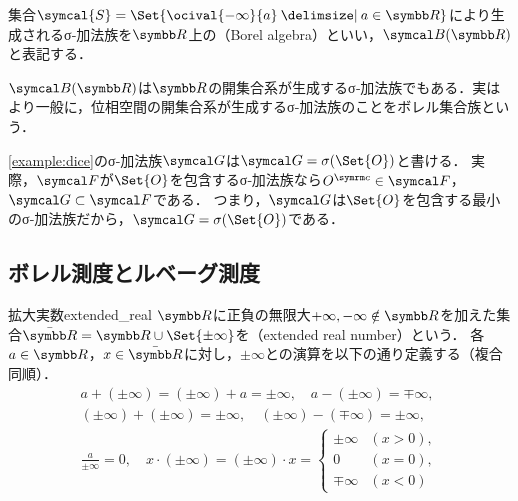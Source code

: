 \documentclass[../../main]{subfiles}
\begin{document}
\begin{example}[ボレル集合族]
  集合\(\symcal{S}=\Set{\ocival{-\infty}{a}\given a\in\numset{R}}\)により生成されるσ‐加法族を\(\numset{R}\)上の（Borel algebra）といい，\(\borelset{\numset{R}}\)と表記する．
\end{example}

\begin{note}
  \(\borelset{\numset{R}}\)は\(\numset{R}\)の開集合系が生成するσ‐加法族でもある．実はより一般に，位相空間の開集合系が生成するσ‐加法族のことをボレル集合族という．
\end{note}

\begin{example}
  \cref{example:dice}のσ‐加法族\(\sigmaalg{G}\)は\(\sigmaalg{G}=\sigmagen{\Set{O}}\)と書ける．
  実際，\(\sigmaalg{F}\)が\(\Set{O}\)を包含するσ‐加法族なら\(\scomp{O}\in\sigmaalg{F}\)，\(\sigmaalg{G}\subset\sigmaalg{F}\)である．
  つまり，\(\sigmaalg{G}\)は\(\Set{O}\)を包含する最小のσ‐加法族だから，\(\sigmaalg{G}=\sigmagen{\Set{O}}\)である．
\end{example}

\subsection{ボレル測度とルベーグ測度}

\begin{definition}{拡大実数}{extended_real}
  \(\numset{R}\)に正負の無限大\(+\infty,-\infty\notin\numset{R}\)を加えた集合\(\extendedreal=\numset{R}\cup\Set{\pm\infty}\)を（extended real number）という．
  各\(a\in\numset{R}\)，\(x\in\extendedreal\)に対し，\(\pm\infty\)との演算を以下の通り定義する（複合同順）．
  \begin{gather*}
    a+(\pm\infty) = (\pm\infty)+a = \pm\infty,
    \quad a-(\pm\infty) = \mp\infty, \\
    (\pm\infty)+(\pm\infty) = \pm\infty,
    \quad(\pm\infty)-(\mp\infty) = \pm\infty, \\
    \frac{a}{\pm\infty} = 0,
    \quad x\cdot(\pm\infty) = (\pm\infty)\cdot x = \begin{cases}\pm\infty & (x>0),\\ 0 & (x=0), \\ \mp\infty & (x<0)\end{cases}
  \end{gather*}
\end{definition}
\end{document}
